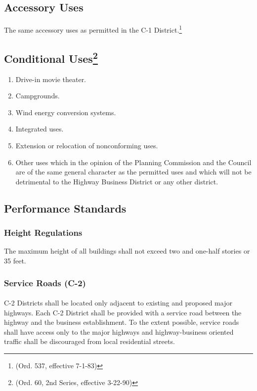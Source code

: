 \subsection{Accessory Uses}
The same accessory uses as permitted in the C-1 District.\footnote{(Ord. 537, effective 7-1-83)}
\subsection{Conditional Uses\footnote{(Ord. 60, 2nd Series, effective 3-22-90)}}
\begin{enumerate}[{\indent}1)]
    \item Drive-in movie theater.  
    \item Campgrounds.  
    \item Wind energy conversion systems.
    \item Integrated uses.
    \item Extension or relocation of nonconforming uses.
    \item Other uses which in the opinion of the Planning Commission and the Council are of the same general character as the permitted uses and which will not be detrimental to the Highway Business District or any other district.
\end{enumerate}
\subsection{Performance Standards}
\subsubsection{Height Regulations}
The maximum height of all buildings shall not exceed two and one-half stories or 35 feet.
\subsubsection{Service Roads (C-2)}
\paragraph{}
C-2 Districts shall be located only adjacent to existing and proposed major highways. Each C-2 District shall be provided with a service road between the highway and the business establishment. To the extent possible, service roads shall have access only to the major highways and highway-business oriented traffic shall be discouraged from local residential streets.
